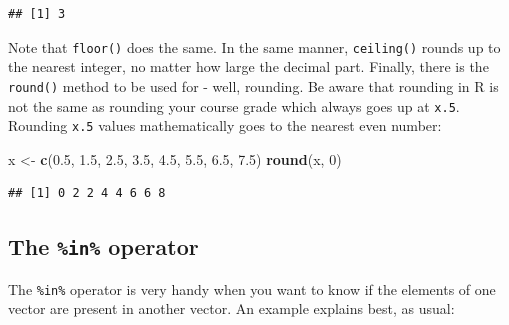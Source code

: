 \documentclass[]{book}
\newenvironment{Shaded}{\begin{snugshade}}{\end{snugshade}}
\newcommand{\DecValTok}[1]{\textcolor[rgb]{0.00,0.00,0.81}{#1}}
\newcommand{\FloatTok}[1]{\textcolor[rgb]{0.00,0.00,0.81}{#1}}
\newcommand{\KeywordTok}[1]{\textcolor[rgb]{0.13,0.29,0.53}{\textbf{#1}}}
\newcommand{\NormalTok}[1]{#1}
\newcommand{\OperatorTok}[1]{\textcolor[rgb]{0.81,0.36,0.00}{\textbf{#1}}}
\newcommand{\StringTok}[1]{\textcolor[rgb]{0.31,0.60,0.02}{#1}}
\begin{document}
\begin{Shaded}
\end{Shaded}

\begin{verbatim}
## [1] 3
\end{verbatim}

Note that \texttt{floor()} does the same. In the same manner, \texttt{ceiling()} rounds up to the nearest integer, no matter how large the decimal part. Finally, there is the \texttt{round()} method to be used for - well, rounding. Be aware that rounding in R is not the same as rounding your course grade which always goes up at \texttt{x.5}. Rounding \texttt{x.5} values mathematically goes to the nearest even number:

\begin{Shaded}
\begin{Highlighting}[]
\NormalTok{x <-}\StringTok{ }\KeywordTok{c}\NormalTok{(}\FloatTok{0.5}\NormalTok{, }\FloatTok{1.5}\NormalTok{, }\FloatTok{2.5}\NormalTok{, }\FloatTok{3.5}\NormalTok{, }\FloatTok{4.5}\NormalTok{, }\FloatTok{5.5}\NormalTok{, }\FloatTok{6.5}\NormalTok{, }\FloatTok{7.5}\NormalTok{)}
\KeywordTok{round}\NormalTok{(x, }\DecValTok{0}\NormalTok{)}
\end{Highlighting}
\end{Shaded}

\begin{verbatim}
## [1] 0 2 2 4 4 6 6 8
\end{verbatim}

\hypertarget{the-in-operator}{%
\subsection{\texorpdfstring{The \texttt{\%in\%} operator}{The \%in\% operator}}\label{the-in-operator}}

The \texttt{\%in\%} operator is very handy when you want to know if the elements of one vector are present in another vector. An example explains best, as usual:

\begin{Shaded}
\end{Shaded}
\end{document}
